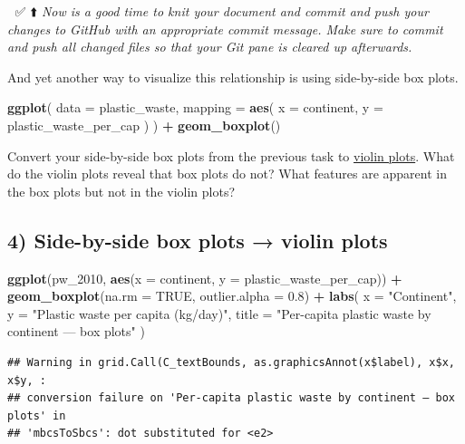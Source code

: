 \documentclass[
]{article}
\newenvironment{Shaded}{\begin{snugshade}}{\end{snugshade}}
\newcommand{\AttributeTok}[1]{\textcolor[rgb]{0.13,0.29,0.53}{#1}}
\newcommand{\ConstantTok}[1]{\textcolor[rgb]{0.56,0.35,0.01}{#1}}
\newcommand{\FloatTok}[1]{\textcolor[rgb]{0.00,0.00,0.81}{#1}}
\newcommand{\FunctionTok}[1]{\textcolor[rgb]{0.13,0.29,0.53}{\textbf{#1}}}
\newcommand{\NormalTok}[1]{#1}
\newcommand{\SpecialCharTok}[1]{\textcolor[rgb]{0.81,0.36,0.00}{\textbf{#1}}}
\newcommand{\StringTok}[1]{\textcolor[rgb]{0.31,0.60,0.02}{#1}}
\begin{document}
🧶 ✅ ⬆️ \emph{Now is a good time to knit your document and commit and
push your changes to GitHub with an appropriate commit message. Make
sure to commit and push all changed files so that your Git pane is
cleared up afterwards.}

And yet another way to visualize this relationship is using side-by-side
box plots.

\begin{Shaded}
\begin{Highlighting}[]
\FunctionTok{ggplot}\NormalTok{(}
  \AttributeTok{data =}\NormalTok{ plastic\_waste,}
  \AttributeTok{mapping =} \FunctionTok{aes}\NormalTok{(}
    \AttributeTok{x =}\NormalTok{ continent,}
    \AttributeTok{y =}\NormalTok{ plastic\_waste\_per\_cap}
\NormalTok{  )}
\NormalTok{) }\SpecialCharTok{+}
  \FunctionTok{geom\_boxplot}\NormalTok{()}
\end{Highlighting}
\end{Shaded}

Convert your side-by-side box plots from the previous task to
\href{http://ggplot2.tidyverse.org/reference/geom_violin.html}{violin
plots}. What do the violin plots reveal that box plots do not? What
features are apparent in the box plots but not in the violin plots?

\subsection{4) Side-by-side box plots → violin
plots}\label{side-by-side-box-plots-violin-plots}

\begin{Shaded}
\begin{Highlighting}[]
\FunctionTok{ggplot}\NormalTok{(pw\_2010, }\FunctionTok{aes}\NormalTok{(}\AttributeTok{x =}\NormalTok{ continent, }\AttributeTok{y =}\NormalTok{ plastic\_waste\_per\_cap)) }\SpecialCharTok{+}
  \FunctionTok{geom\_boxplot}\NormalTok{(}\AttributeTok{na.rm =} \ConstantTok{TRUE}\NormalTok{, }\AttributeTok{outlier.alpha =} \FloatTok{0.8}\NormalTok{) }\SpecialCharTok{+}
  \FunctionTok{labs}\NormalTok{(}
    \AttributeTok{x =} \StringTok{"Continent"}\NormalTok{, }\AttributeTok{y =} \StringTok{"Plastic waste per capita (kg/day)"}\NormalTok{,}
    \AttributeTok{title =} \StringTok{"Per{-}capita plastic waste by continent — box plots"}
\NormalTok{  )}
\end{Highlighting}
\end{Shaded}

\begin{verbatim}
## Warning in grid.Call(C_textBounds, as.graphicsAnnot(x$label), x$x, x$y, :
## conversion failure on 'Per-capita plastic waste by continent — box plots' in
## 'mbcsToSbcs': dot substituted for <e2>
\end{verbatim}
\end{document}
